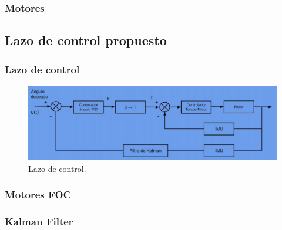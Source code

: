 \subsubsection{Motores}
\subsection{Lazo de control propuesto}
\subsubsection{Lazo de control}
\begin{figure}[H]
	\center
	\includegraphics[width=1\linewidth, page=1]{Imagenes/lazo_de_control}
	\caption{Lazo de control.}
	\label{fig:control:lazo}
\end{figure}

\subsubsection{Motores FOC}
\subsubsection{Kalman Filter}




